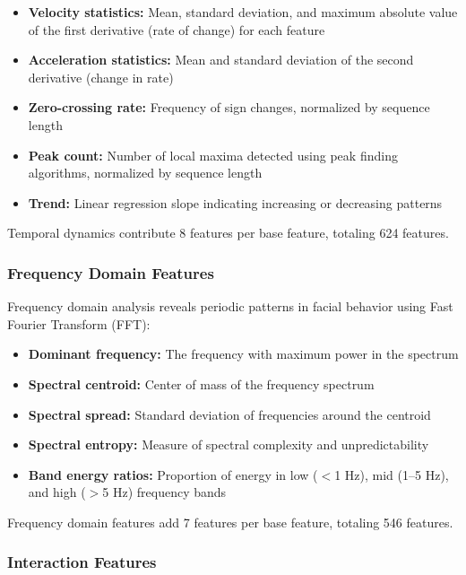 \documentclass[11pt,a4paper]{article}
\begin{document}
\begin{itemize}
    \item \textbf{Velocity statistics:} Mean, standard deviation, and maximum absolute value of the first derivative (rate of change) for each feature
    \item \textbf{Acceleration statistics:} Mean and standard deviation of the second derivative (change in rate)
    \item \textbf{Zero-crossing rate:} Frequency of sign changes, normalized by sequence length
    \item \textbf{Peak count:} Number of local maxima detected using peak finding algorithms, normalized by sequence length
    \item \textbf{Trend:} Linear regression slope indicating increasing or decreasing patterns
\end{itemize}

Temporal dynamics contribute 8 features per base feature, totaling 624 features.

\subsubsection{Frequency Domain Features}

Frequency domain analysis reveals periodic patterns in facial behavior using Fast Fourier Transform (FFT):

\begin{itemize}
    \item \textbf{Dominant frequency:} The frequency with maximum power in the spectrum
    \item \textbf{Spectral centroid:} Center of mass of the frequency spectrum
    \item \textbf{Spectral spread:} Standard deviation of frequencies around the centroid
    \item \textbf{Spectral entropy:} Measure of spectral complexity and unpredictability
    \item \textbf{Band energy ratios:} Proportion of energy in low ($<$1 Hz), mid (1--5 Hz), and high ($>$5 Hz) frequency bands
\end{itemize}

Frequency domain features add 7 features per base feature, totaling 546 features.

\subsubsection{Interaction Features}
\end{document}
